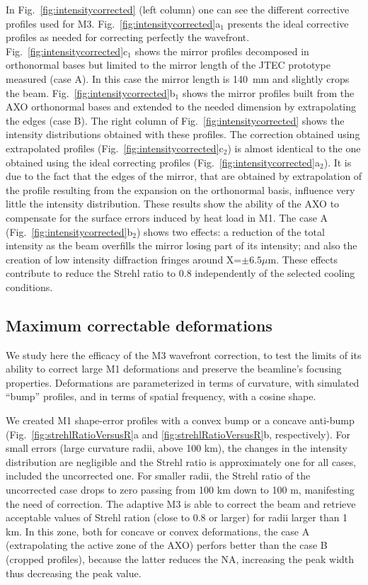 \documentclass{iucr}
\newcommand{\inblue}[1]{{\color{blue}#1}}
\begin{document}
In Fig.~\ref{fig:intensitycorrected} (left column) one can see the different corrective profiles used for M3. 
Fig.~\ref{fig:intensitycorrected}a$_1$ presents the ideal corrective profiles as needed for correcting perfectly the wavefront.
\inblue{
Fig.~\ref{fig:intensitycorrected}c$_1$ shows the mirror profiles decomposed in orthonormal bases but limited to the mirror length of the JTEC prototype measured (case A). In this case the mirror length is 140~mm and slightly crops the beam.
Fig.~\ref{fig:intensitycorrected}b$_1$ shows the mirror profiles built from the AXO orthonormal bases and extended to the needed dimension by extrapolating the edges (case B).
}
The right column of Fig.~\ref{fig:intensitycorrected} shows the intensity distributions obtained with these profiles.
The correction obtained using extrapolated profiles (Fig.~\ref{fig:intensitycorrected}c$_2$) is almost identical to the one obtained using the ideal correcting profiles (Fig.~\ref{fig:intensitycorrected}a$_2$). It is due to the fact that the edges of the mirror, that are obtained by extrapolation of the profile resulting from the expansion on the orthonormal basis, influence very little the intensity distribution.
These results show the ability of the AXO to compensate for the surface errors induced by heat load in M1. The case A (Fig.~\ref{fig:intensitycorrected}b$_2$) shows two effects: a reduction of the total intensity as the beam overfills the mirror losing part of its intensity; and also the creation of low intensity diffraction fringes around X=$\pm6.5\mu$m. These effects contribute to reduce the Strehl ratio to 0.8 independently of the selected cooling conditions.


\subsection{Maximum correctable deformations}
\label{sec:scans}

We study here the efficacy of the M3 wavefront correction, to test the limits of its ability to correct large M1 deformations and preserve the beamline's focusing properties. Deformations are parameterized in terms of curvature, with simulated ``bump'' profiles, and in terms of spatial frequency, with a cosine shape.

We created M1 shape-error profiles with a convex bump or a concave anti-bump (Fig.~\ref{fig:strehlRatioVersusR}a and \ref{fig:strehlRatioVersusR}b, respectively). For small errors (large curvature radii, above 100 km), the changes in the intensity distribution are negligible and the Strehl ratio is approximately one for all cases, included the uncorrected one. For smaller radii, the Strehl ratio of the uncorrected case drops to zero passing from 100 km down to 100 m, manifesting the need of correction. The adaptive M3 is able to correct the beam and retrieve acceptable values of Strehl ration (close to 0.8 or larger) for radii larger than 1 km. In this zone, both for concave or convex deformations, the case A (extrapolating the active zone of the AXO) perfors better than the case B (cropped profiles), because the latter reduces the NA, increasing the peak width thus decreasing the peak value.
\end{document}
